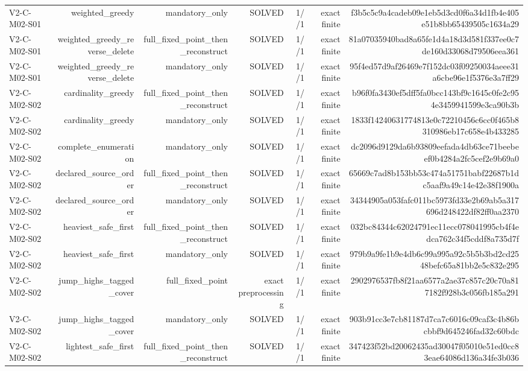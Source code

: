 {\begin{longtable}{lrrrrrr}
V2-C-M02-S01 & weighted\_greedy & mandatory\_only & SOLVED & 1//1 & exact finite & f3b5c5c9a4cadeb09e1eb5d3cd0f6a34d1fb4e405e51b8bb65439505c1634a29 \\
V2-C-M02-S01 & weighted\_greedy\_reverse\_delete & full\_fixed\_point\_then\_reconstruct & SOLVED & 1//1 & exact finite & 81a07035940bad8a65fe1d4a18d3d581f337ee0c7de160d33068d79506eea361 \\
V2-C-M02-S01 & weighted\_greedy\_reverse\_delete & mandatory\_only & SOLVED & 1//1 & exact finite & 95f4ed57d9af26469e7f152dc03f09250034aeee31a6cbe96e1f5376e3a7ff29 \\
V2-C-M02-S02 & cardinality\_greedy & full\_fixed\_point\_then\_reconstruct & SOLVED & 1//1 & exact finite & b96f0fa3430ef5dff5fa0bcc143bf9c1645c0fe2c954e3459941599e3ca90b3b \\
V2-C-M02-S02 & cardinality\_greedy & mandatory\_only & SOLVED & 1//1 & exact finite & 1833f14240631774813e0c72210456c6cc0f465b8310986eb17c658e4b433285 \\
V2-C-M02-S02 & complete\_enumeration & mandatory\_only & SOLVED & 1//1 & exact finite & dc2096d9129da6b93809eefada4db63ce71beebeef0b4284a2fc5cef2e9b69a0 \\
V2-C-M02-S02 & declared\_source\_order & full\_fixed\_point\_then\_reconstruct & SOLVED & 1//1 & exact finite & 65669c7ad8b153bb53c474a51751babf22687b1dc5aaf9a49c14e42e38f1900a \\
V2-C-M02-S02 & declared\_source\_order & mandatory\_only & SOLVED & 1//1 & exact finite & 34344905a053fafc011bc5973fd33e2b69ab5a317696d248422df82ff0aa2370 \\
V2-C-M02-S02 & heaviest\_safe\_first & full\_fixed\_point\_then\_reconstruct & SOLVED & 1//1 & exact finite & 032bc84344c62024791ec11ecc078041995cb4f4edca762c34f5cddf8a735d7f \\
V2-C-M02-S02 & heaviest\_safe\_first & mandatory\_only & SOLVED & 1//1 & exact finite & 979b9a9fe1b9e4db6c99a995a92c5b5b3bd2cd2548befc65a81bb2e5c832e295 \\
V2-C-M02-S02 & jump\_highs\_tagged\_cover & full\_fixed\_point & exact preprocessing & 1//1 & exact finite & 2902976537fb8f21aa6577a2ae37c857c20c70a817182f928b3c056fb185a291 \\
V2-C-M02-S02 & jump\_highs\_tagged\_cover & mandatory\_only & SOLVED & 1//1 & exact finite & 903b91cc3e7cb81187d7ca7c6016c09caf3c4b86bcbbf9d645246fad32c60bdc \\
V2-C-M02-S02 & lightest\_safe\_first & full\_fixed\_point\_then\_reconstruct & SOLVED & 1//1 & exact finite & 347423f52bd20062435ad30047f05010e51ed0cc83eae64086d136a34fe3b036 \\

\end{longtable}}
